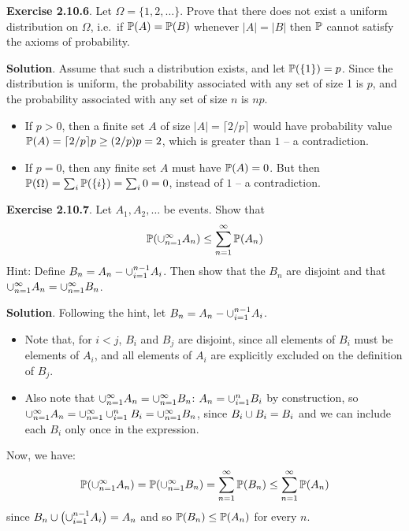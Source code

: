 \textbf{Exercise 2.10.6}. Let \(\Omega = \{1, 2, \dots\}\). Prove that there does not exist a uniform distribution on \(\Omega\), i.e.~if \(\operatorname{\mathbb{P}}(A)  =\operatorname{\mathbb{P}}(B)\) whenever \(|A| = |B|\) then \(\operatorname{\mathbb{P}}\) cannot satisfy the axioms of probability.

\textbf{Solution}. Assume that such a distribution exists, and let \(\operatorname{\mathbb{P}}(\{1\}) = p\). Since the distribution is uniform, the probability associated with any set of size 1 is \(p\), and the probability associated with any set of size \(n\) is \(np\).
\begin{itemize}
\item
  If \(p > 0\), then a finite set \(A\) of size
  \(|A| = \lceil 2 / p \rceil\) would have probability value
  \(\operatorname{\mathbb{P}}(A) = \lceil 2 / p \rceil p \geq (2 / p) p = 2\), which is
  greater than \(1\) -- a contradiction.
\item
  If \(p = 0\), then any finite set \(A\) must have
  \(\operatorname{\mathbb{P}}(A) = 0\). But then
  \(\operatorname{\mathbb{P}}(\Omega) = \sum_{i} \operatorname{\mathbb{P}}(\{ i \}) = \sum_{i} 0 = 0\),
  instead of \(1\) -- a contradiction.
\end{itemize}

\textbf{Exercise 2.10.7}. Let \(A_{1}, A_{2}, \dots\) be events. Show that
\[
\PROB\left( \union_{n=1}^{\infty} A_{n} \right) \leq \sum_{n=1}^{\infty} \PROB(A_{n}) 
\]
Hint: Define \(B_{n} = A_{n} - \cup_{i=1}^{n-1} A_{i}\). Then show that the
\(B_{n}\) are disjoint and that
\(\cup_{n=1}^{\infty} A_{n}  =\cup_{n=1}^{\infty} B_{n}\).

\textbf{Solution}. Following the hint, let
\(B_{n} = A_{n} - \cup_{i=1}^{n-1} A_{i}\).
\begin{itemize}[tightlist]
\item
  Note that, for \(i < j\), \(B_{i}\) and \(B_{j}\) are disjoint, since all
  elements of \(B_{i}\) must be elements of \(A_{i}\), and all elements of
  \(A_{i}\) are explicitly excluded on the definition of \(B_{j}\).
\item
  Also note that \(\cup_{n=1}^{\infty} A_{n} = \cup_{n=1}^{\infty} B_{n}\):
  \(A_{n} = \cup_{i=1}^{n} B_{i}\) by construction, so
  \(\cup_{n=1}^{\infty} A_{n} = \cup_{n=1}^{\infty} \cup_{i=1}^{n} B_{i} = \cup_{n=1}^{\infty} B_{n}\),
  since \(B_{i} \cup B_{i} = B_{i}\) and we can include each \(B_{i}\) only once
  in the expression.
\end{itemize}
Now, we have:
\[
\PROB\left( \union_{n=1}^{\infty} A_{n} \right) = \PROB\left( \union_{n=1}^{\infty} B_{n} \right) = \sum_{n=1}^{\infty} \PROB(B_{n}) \leq \sum_{n=1}^{\infty} \PROB(A_{n}) 
\]
since \(B_{n} \union \left(\union_{i=1}^{n-1} A_{i}\right) = A_{n}\) and so
\(\operatorname{\mathbb{P}}(B_{n}) \leq \operatorname{\mathbb{P}}(A_{n})\) for every \(n\).

